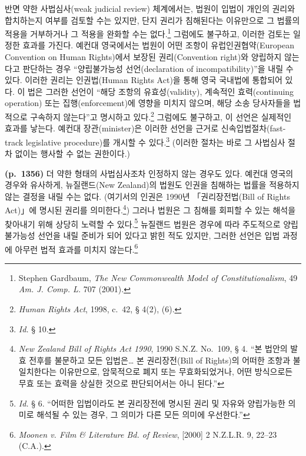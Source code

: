 \documentclass[a4paper,12pt,oneside]{article}  %
\begin{document}
반면 약한 사법심사(weak judicial review) 체계에서는, 법원이 입법이
개인의 권리와 합치하는지 여부를 검토할 수는 있지만, 단지 권리가
침해된다는 이유만으로 그 법률의 적용을 거부하거나 그 적용을 완화할 수는
없다.\footnote{Stephen Gardbaum, \emph{The New Commonwealth Model of
  Constitutionalism}, 49 \emph{Am. J. Comp. L.} 707 (2001).} 그럼에도
불구하고, 이러한 검토는 일정한 효과를 가진다. 예컨대 영국에서는 법원이
어떤 조항이 유럽인권협약(European Convention on Human Rights)에서 보장된
권리(Convention right)와 양립하지 않는다고 판단하는 경우 ``양립불가능성
선언(declaration of incompatibility)''을 내릴 수 있다. 이러한 권리는
인권법(Human Rights Act)을 통해 영국 국내법에 통합되어 있다. 이 법은
그러한 선언이 ``해당 조항의 유효성(validity), 계속적인 효력(continuing
operation) 또는 집행(enforcement)에 영향을 미치지 않으며, 해당 소송
당사자들을 법적으로 구속하지 않는다''고 명시하고 있다.\footnote{\emph{Human
  Rights Act}, 1998, c.~42, § 4(2), (6).} 그럼에도 불구하고, 이 선언은
실제적인 효과를 낳는다. 예컨대 장관(minister)은 이러한 선언을 근거로
신속입법절차(fast-track legislative procedure)를 개시할 수
있다.\footnote{\emph{Id.} § 10.} (이러한 절차는 바로 그 사법심사 절차
없이는 행사할 수 없는 권한이다.)

\textbf{(p.~1356)} 더 약한 형태의 사법심사조차 인정하지 않는 경우도
있다. 예컨대 영국의 경우와 유사하게, 뉴질랜드(New Zealand)의 법원도
인권을 침해하는 법률을 적용하지 않는 결정을 내릴 수는 없다. (여기서의
인권은 1990년 「권리장전법(Bill of Rights Act)」에 명시된 권리를
의미한다.\footnote{\emph{New Zealand Bill of Rights Act 1990}, 1990
  S.N.Z. No.~109, § 4. ``본 법안의 발효 전후를 불문하고 모든
  입법은\ldots{} 본 권리장전(Bill of Rights)의 어떠한 조항과
  불일치한다는 이유만으로, 암묵적으로 폐지 또는 무효화되었거나, 어떤
  방식으로든 무효 또는 효력을 상실한 것으로 판단되어서는 아니 된다.''})
그러나 법원은 그 침해를 회피할 수 있는 해석을 찾아내기 위해 상당히
노력할 수 있다.\footnote{\emph{Id.} § 6. ``어떠한 입법이라도 본
  권리장전에 명시된 권리 및 자유와 양립가능한 의미로 해석될 수 있는
  경우, 그 의미가 다른 모든 의미에 우선한다.''} 뉴질랜드 법원은 경우에
따라 주도적으로 양립불가능성 선언을 내릴 준비가 되어 있다고 밝힌 적도
있지만, 그러한 선언은 입법 과정에 아무런 법적 효과를 미치지
않는다.\footnote{\emph{Moonen v. Film \& Literature Bd. of Review},
  {[}2000{]} 2 N.Z.L.R. 9, 22--23 (C.A.).}
\end{document}
